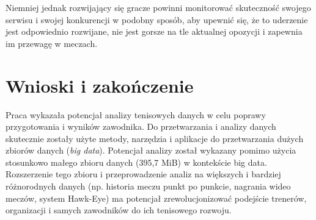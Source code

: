 \documentclass[12pt, a4paper]{article}
\begin{document}
Niemniej jednak rozwijający się gracze powinni monitorować skuteczność swojego serwisu i swojej konkurencji w podobny sposób, aby upewnić się, że to uderzenie jest odpowiednio rozwijane, nie jest gorsze na tle aktualnej opozycji i zapewnia im przewagę w meczach.



\section{Wnioski i zakończenie}
Praca wykazała potencjał analizy tenisowych danych w celu poprawy przygotowania i wyników zawodnika. Do przetwarzania i analizy danych skutecznie zostały użyte metody, narzędzia i aplikacje do przetwarzania dużych zbiorów danych (\textit{big data}). Potencjał analizy został wykazany pomimo użycia stosunkowo małego zbioru danych (395,7 MiB) w kontekście big data. Rozszerzenie tego zbioru i przeprowadzenie analiz na większych i bardziej różnorodnych danych (np. historia meczu punkt po punkcie, nagrania wideo meczów, system Hawk-Eye) ma potencjał zrewolucjonizować podejście trenerów, organizacji i samych zawodników do ich tenisowego rozwoju.
\end{document}
